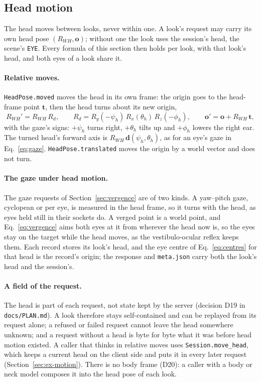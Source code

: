 \documentclass[11pt,a4paper]{article}
\newcommand{\code}[1]{\texttt{\small #1}}
\newcommand{\vb}[1]{\mathbf{#1}}
\begin{document}
\subsection{Head motion}\label{sec:motion}

The head moves between looks, never within one. A look's request may carry its own head pose
$(R_{WH}, \vb{o})$; without one the look uses the session's head, the scene's \code{EYE}. Every formula of this
section then holds per look, with that look's head, and both eyes of a look share it.

\paragraph{Relative moves.} \code{HeadPose.moved} moves the head in its own frame: the origin goes to the
head-frame point $\vb{t}$, then the head turns about its new origin,
\begin{equation}\label{eq:moved}
R_{WH}' = R_{WH}\,R_d, \qquad R_d = R_y(-\psi_h)\,R_x(\theta_h)\,R_z(-\phi_h), \qquad
\vb{o}' = \vb{o} + R_{WH}\,\vb{t},
\end{equation}
with the gaze's signs: $+\psi_h$ turns right, $+\theta_h$ tilts up and $+\phi_h$ lowers the right ear. The
turned head's forward axis is $R_{WH}\,\vb{d}(\psi_h,\theta_h)$, as for an eye's gaze in Eq.~\eqref{eq:gaze}.
\code{HeadPose.translated} moves the origin by a world vector and does not turn.

\paragraph{The gaze under head motion.} The gaze requests of Section~\ref{sec:vergence} are of two kinds. A
yaw--pitch gaze, cyclopean or per eye, is measured in the head frame, so it turns with the head, as eyes held
still in their sockets do. A verged point is a world point, and Eq.~\eqref{eq:vergence} aims both eyes at it from
wherever the head now is, so the eyes stay on the target while the head moves, as the vestibulo-ocular reflex
keeps them. Each record stores its look's head, and the eye centre of Eq.~\eqref{eq:centres} for that head is
the record's origin; the response and \code{meta.json} carry both the look's head and the session's.

\paragraph{A field of the request.} The head is part of each request, not state kept by the server (decision
D19 in \code{docs/PLAN.md}). A look therefore stays self-contained and can be replayed from its request alone; a
refused or failed request cannot leave the head somewhere unknown; and a request without a head is byte for byte
what it was before head motion existed. A caller that thinks in relative moves uses \code{Session.move\_head},
which keeps a current head on the client side and puts it in every later request (Section~\ref{sec:ex-motion}).
There is no body frame (D20): a caller with a body or neck model composes it into the head pose of each look.
\end{document}
